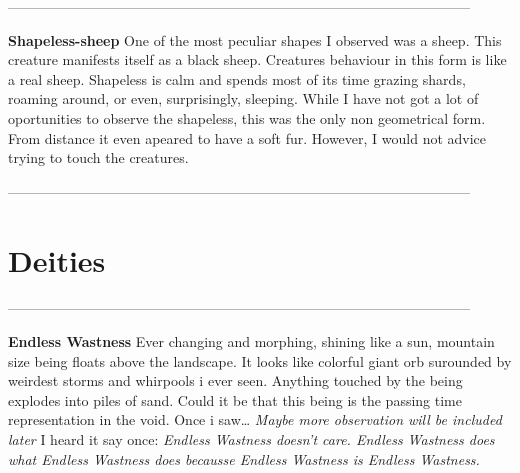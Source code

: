 \documentclass[14p]{book}
\begin{document}
{\color{l} ---------------------------------------------------------------------------------------------------\\}

\textbf{Shapeless-sheep} One of the most peculiar shapes I observed was a sheep. This creature manifests itself as a black sheep. Creatures behaviour in this form is like a real sheep. Shapeless is calm and spends most of its time grazing shards, roaming around, or even, surprisingly, sleeping. While I have not got a lot of oportunities to observe the shapeless, this was the only non geometrical form. From distance it even apeared to have a soft fur. However, I would not advice trying to touch the creatures.

{\color{l} ---------------------------------------------------------------------------------------------------\\}

\section{Deities}

{\color{l} ---------------------------------------------------------------------------------------------------\\}

\textbf{Endless Wastness} Ever changing and morphing, shining like a sun, mountain size being floats above the landscape. It looks like colorful giant orb surounded by weirdest storms and whirpools i ever seen. Anything touched by the being explodes into piles of sand. Could it be that this being is the passing time representation in the void. Once i saw… \emph{Maybe more observation will be included later} I heard it say once: \emph{Endless Wastness doesn’t care. Endless Wastness does what Endless Wastness does becausse Endless Wastness is Endless Wastness.}

\end{document}
